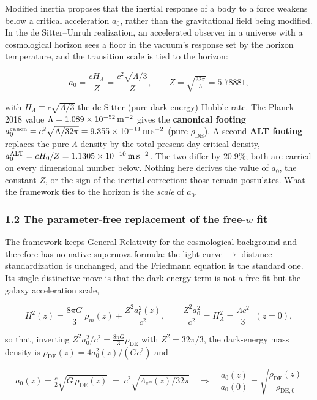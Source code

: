 \documentclass[
]{article}
\begin{document}
Modified inertia proposes that the inertial response of a body to a
force weakens below a critical acceleration \(a_0\), rather than the
gravitational field being modified. In the de Sitter--Unruh realization,
an accelerated observer in a universe with a cosmological horizon sees a
floor in the vacuum's response set by the horizon temperature, and the
transition scale is tied to the horizon:

\[a_0=\frac{cH_\Lambda}{Z}=\frac{c^2\sqrt{\Lambda/3}}{Z},\qquad Z=\sqrt{\tfrac{32\pi}{3}}=5.78881,\]

with \(H_\Lambda\equiv c\sqrt{\Lambda/3}\) the de Sitter (pure
dark-energy) Hubble rate. The Planck 2018 value
\(\Lambda=1.089\times10^{-52}\,{\rm m^{-2}}\) gives the
\textbf{canonical footing}
\(a_0^\mathrm{canon}=c^2\sqrt{\Lambda/32\pi}=9.355\times10^{-11}\,{\rm m\,s^{-2}}\)
(pure \(\rho_\mathrm{DE}\)). A second \textbf{ALT footing} replaces the
pure-\(\Lambda\) density by the total present-day critical density,
\(a_0^\mathrm{ALT}=cH_0/Z=1.1305\times10^{-10}\,{\rm m\,s^{-2}}\). The two
differ by \(20.9\%\); both are carried on every dimensional number
below. Nothing here derives the value of \(a_0\), the constant \(Z\), or
the sign of the inertial correction: those remain postulates. What the
framework ties to the horizon is the \emph{scale} of \(a_0\).

\subsubsection{\texorpdfstring{1.2 The parameter-free replacement of the
free-\(w\)
fit}{1.2 The parameter-free replacement of the free-w fit}}\label{the-parameter-free-replacement-of-the-free-w-fit}

The framework keeps General Relativity for the cosmological background
and therefore has no native supernova formula: the light-curve \(\to\)
distance standardization is unchanged, and the Friedmann equation is the
standard one. Its single distinctive move is that the dark-energy term
is not a free fit but the galaxy acceleration scale,

\[H^2(z)=\frac{8\pi G}{3}\,\rho_m(z)+\frac{Z^2a_0^2(z)}{c^2},\qquad \frac{Z^2a_0^2}{c^2}=H_\Lambda^2=\frac{\Lambda c^2}{3}\;\;(z=0),\]

so that, inverting \(Z^2a_0^2/c^2=\tfrac{8\pi G}{3}\rho_\mathrm{DE}\) with
\(Z^2=32\pi/3\), the dark-energy mass density is
\(\rho_\mathrm{DE}(z)=4a_0^2(z)/(Gc^2)\) and

\[\boxed{\;a_0(z)=\tfrac{c}{2}\sqrt{G\,\rho_\mathrm{DE}(z)}\;=\;c^2\sqrt{\Lambda_\mathrm{eff}(z)/32\pi}\quad\Longrightarrow\quad \frac{a_0(z)}{a_0(0)}=\sqrt{\frac{\rho_\mathrm{DE}(z)}{\rho_\mathrm{DE,0}}}\;}\]
\end{document}
